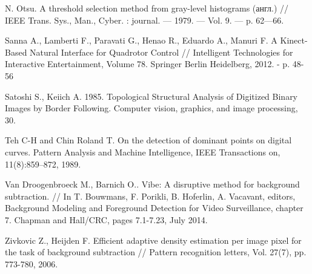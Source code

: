 \begin{thebibliography}{99}
N. Otsu. A threshold selection method from gray-level histograms
(англ.) // IEEE Trans. Sys., Man., Cyber. : journal. — 1979. — Vol. 9.
— p. 62—66.

Sanna A., Lamberti F., Paravati G., Henao R., Eduardo A., Manuri F. A Kinect-Based Natural
Interface for Quadrotor Control // Intelligent Technologies for Interactive Entertainment, 
Volume 78. Springer Berlin Heidelberg, 2012. - p. 48-56

Satoshi S., Keiich A. 1985. Topological Structural Analysis of
Digitized Binary Images by Border Following. Computer vision, graphics,
and image processing, 30. 

Teh C-H and Chin Roland T. On the detection of dominant points on
digital curves. Pattern Analysis and Machine Intelligence, IEEE
Transactions on, 11(8):859–872, 1989.

Van Droogenbroeck M., Barnich O.. Vibe: A disruptive
method for background subtraction. // In T. Bouwmans, F.
Porikli, B. Hoferlin, A. Vacavant, editors, Background
Modeling and Foreground Detection for Video Surveillance,
chapter 7. Chapman and Hall/CRC, pages 7.1-7.23, July
2014.

Zivkovic Z., Heijden F. Efficient adaptive density
estimation per image pixel for the task of background
subtraction // Pattern recognition letters, Vol. 27(7),
pp. 773-780, 2006.

\end{thebibliography}

